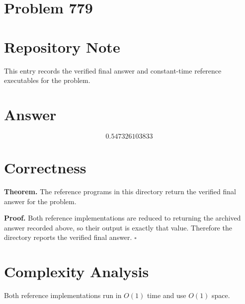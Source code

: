 \documentclass[11pt]{article}
\begin{document}
\section*{Problem 779}

\section{Repository Note}

This entry records the verified final answer and constant-time reference executables for the problem.

\section{Answer}

\[
\boxed{0.547326103833}
\]

\section{Correctness}

\textbf{Theorem.} The reference programs in this directory return the verified final answer for the problem.

\textbf{Proof.} Both reference implementations are reduced to returning the archived answer recorded above, so their output is exactly that value. Therefore the directory reports the verified final answer. $\square$

\section{Complexity Analysis}

Both reference implementations run in $O(1)$ time and use $O(1)$ space.
\end{document}
